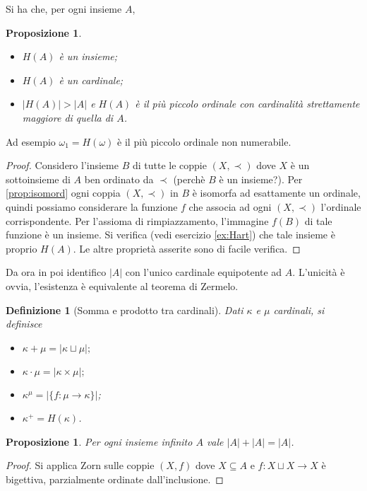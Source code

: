 \documentclass[a4paper,10pt,oneside]{article}
\newcommand{\abs}[1]{\left|#1\right|}
\theoremstyle{plain}
\newtheorem{mydef}[mytheorem]{Definizione}
\newtheorem{myprop}[mytheorem]{Proposizione}
\theoremstyle{definition}
\theoremstyle{remark}
\begin{document}
Si ha che, per ogni insieme $A$,
\begin{myprop}\
\begin{itemize}
 \item $H(A)$ è un insieme;
 \item $H(A)$ è un cardinale;
 \item $\abs{H(A)}>\abs A$ e $H(A)$ è il più piccolo ordinale con cardinalità strettamente maggiore di quella di $A$.
\end{itemize}
\end{myprop}
Ad esempio $\omega_1=H(\omega)$ è il più piccolo ordinale non numerabile. 
\begin{proof}
 Considero l'insieme $B$ di tutte le coppie $(X,\prec)$ dove $X$ è un sottoinsieme di $A$ ben ordinato da $\prec$ (perchè $B$ è un insieme?). Per \ref{prop:isomord} ogni coppia $(X,\prec)$ in $B$ è isomorfa ad esattamente un ordinale, quindi possiamo considerare la funzione $f$ che associa ad ogni $(X,\prec)$ l'ordinale corrispondente. Per l'assioma di rimpiazzamento, l'immagine $f(B)$ di tale funzione è un insieme. Si verifica (vedi esercizio \ref{ex:Hart}) che tale insieme è proprio $H(A)$. Le altre proprietà asserite sono di facile verifica.
\end{proof}

Da ora in poi identifico $\abs A$ con l'unico cardinale equipotente ad $A$. L'unicità è ovvia, l'esistenza è equivalente al teorema di Zermelo.

\begin{mydef}[Somma e prodotto tra cardinali]
 Dati $\kappa$ e $\mu$ cardinali, si definisce
 \begin{itemize}
  \item $\kappa + \mu = \abs{\kappa \sqcup \mu};$
  \item $\kappa \cdot \mu = \abs{\kappa \times \mu};$
  \item $\kappa^\mu = \abs {\{f: \mu \rightarrow \kappa\}}$;
  \item $\kappa^+=H(\kappa)$.
 \end{itemize}

\end{mydef}

\begin{myprop}\label{prop:cardsum}
 Per ogni insieme infinito $A$ vale $\abs A + \abs A = \abs A$.
\end{myprop}

\begin{proof}
 Si applica Zorn sulle coppie $(X,f)$ dove $X\subseteq A$ e $f:X \sqcup X\rightarrow X$ è bigettiva, parzialmente ordinate dall'inclusione. 
\end{proof}
\end{document}
